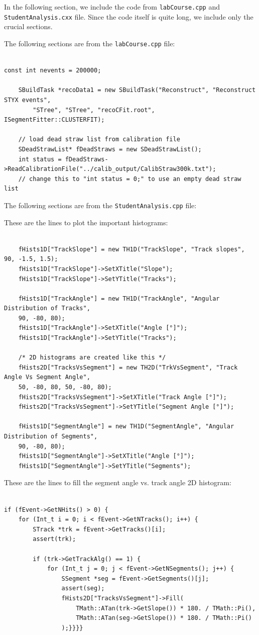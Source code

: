 \documentclass[a4paper]{report}
\numberwithin{equation}{section}
\begin{document}
In the following section, we include the code from \texttt{labCourse.cpp} and \texttt{StudentAnalysis.cxx} file. Since the code itself is quite long, we include only the crucial sections. 

\noindent The following sections are from the \texttt{labCourse.cpp} file:

\begin{verbatim}

const int nevents = 200000;

    SBuildTask *recoData1 = new SBuildTask("Reconstruct", "Reconstruct STYX events",
        "STree", "STree", "recoCFit.root", ISegmentFitter::CLUSTERFIT);

    // load dead straw list from calibration file
    SDeadStrawList* fDeadStraws = new SDeadStrawList();
    int status = fDeadStraws->ReadCalibrationFile("../calib_output/CalibStraw300k.txt"); 
    // change this to "int status = 0;" to use an empty dead straw list

\end{verbatim}

\noindent The following sections are from the \texttt{StudentAnalysis.cpp} file:

\noindent These are the lines to plot the important histograms: 

\begin{verbatim}

	fHists1D["TrackSlope"] = new TH1D("TrackSlope", "Track slopes", 90, -1.5, 1.5);
	fHists1D["TrackSlope"]->SetXTitle("Slope");
	fHists1D["TrackSlope"]->SetYTitle("Tracks");

	fHists1D["TrackAngle"] = new TH1D("TrackAngle", "Angular Distribution of Tracks", 
	90, -80, 80);
	fHists1D["TrackAngle"]->SetXTitle("Angle [°]");
	fHists1D["TrackAngle"]->SetYTitle("Tracks");

	/* 2D histograms are created like this */
	fHists2D["TracksVsSegment"] = new TH2D("TrkVsSegment", "Track Angle Vs Segment Angle", 
	50, -80, 80, 50, -80, 80);
	fHists2D["TracksVsSegment"]->SetXTitle("Track Angle [°]");
	fHists2D["TracksVsSegment"]->SetYTitle("Segment Angle [°]");

	fHists1D["SegmentAngle"] = new TH1D("SegmentAngle", "Angular Distribution of Segments", 
	90, -80, 80);
	fHists1D["SegmentAngle"]->SetXTitle("Angle [°]");
	fHists1D["SegmentAngle"]->SetYTitle("Segments");

\end{verbatim}

\noindent These are the lines to fill the segment angle vs. track angle 2D histogram:

\begin{verbatim}

if (fEvent->GetNHits() > 0) {
	for (Int_t i = 0; i < fEvent->GetNTracks(); i++) {
		STrack *trk = fEvent->GetTracks()[i];
		assert(trk);
		
		if (trk->GetTrackAlg() == 1) {
			for (Int_t j = 0; j < fEvent->GetNSegments(); j++) {
				SSegment *seg = fEvent->GetSegments()[j];
				assert(seg);
				fHists2D["TracksVsSegment"]->Fill(
					TMath::ATan(trk->GetSlope()) * 180. / TMath::Pi(), 
					TMath::ATan(seg->GetSlope()) * 180. / TMath::Pi()
				);}}}}

\end{verbatim}
\end{document}
